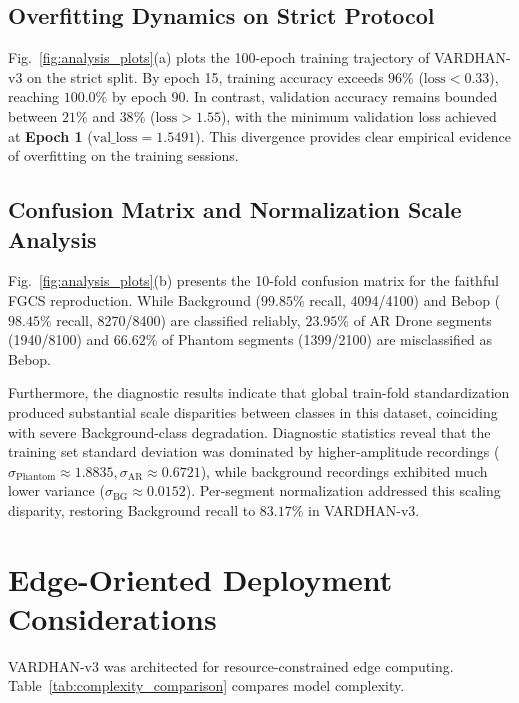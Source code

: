 \documentclass[journal,10pt,twocolumn]{IEEEtran}
\begin{document}
\subsection{Overfitting Dynamics on Strict Protocol}
Fig.~\ref{fig:analysis_plots}(a) plots the 100-epoch training trajectory of VARDHAN-v3 on the strict split. By epoch 15, training accuracy exceeds $96\%$ ($\text{loss} < 0.33$), reaching $100.0\%$ by epoch 90. In contrast, validation accuracy remains bounded between $21\%$ and $38\%$ ($\text{loss} > 1.55$), with the minimum validation loss achieved at \textbf{Epoch 1} ($\text{val\_loss} = 1.5491$). This divergence provides clear empirical evidence of overfitting on the training sessions.

\subsection{Confusion Matrix and Normalization Scale Analysis}
Fig.~\ref{fig:analysis_plots}(b) presents the 10-fold confusion matrix for the faithful FGCS reproduction. While Background ($99.85\%$ recall, 4094/4100) and Bebop ($98.45\%$ recall, 8270/8400) are classified reliably, $23.95\%$ of AR Drone segments (1940/8100) and $66.62\%$ of Phantom segments (1399/2100) are misclassified as Bebop.

Furthermore, the diagnostic results indicate that global train-fold standardization produced substantial scale disparities between classes in this dataset, coinciding with severe Background-class degradation. Diagnostic statistics reveal that the training set standard deviation was dominated by higher-amplitude recordings ($\sigma_{\text{Phantom}} \approx 1.8835, \sigma_{\text{AR}} \approx 0.6721$), while background recordings exhibited much lower variance ($\sigma_{\text{BG}} \approx 0.0152$). Per-segment normalization addressed this scaling disparity, restoring Background recall to $83.17\%$ in VARDHAN-v3.

\section{Edge-Oriented Deployment Considerations}
VARDHAN-v3 was architected for resource-constrained edge computing. Table~\ref{tab:complexity_comparison} compares model complexity.
\end{document}
